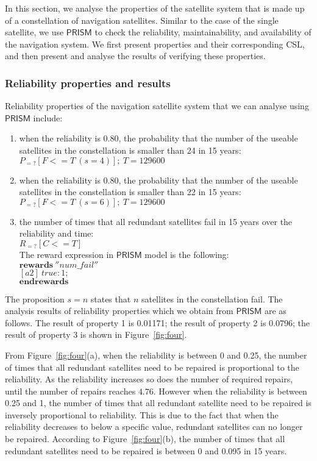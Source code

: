 \documentclass[preprint,12pt]{qrei}
\begin{document}
In this section, we analyse the properties of the satellite system that is made up of a constellation of navigation satellites. Similar to the case of the single satellite, we use $\mathsf{PRISM}$ to check the reliability, maintainability, and availability of the navigation system. We first present properties and their corresponding CSL, and then present and analyse the results of verifying these properties.

\subsubsection{Reliability properties and results}

Reliability properties of the navigation satellite system that we can analyse using $\mathsf{PRISM}$ include:

\begin{enumerate}
\item when the reliability is 0.80, the probability that the number of the useable satellites in the constellation is smaller than 24 in 15 years:\\
$P_{=?}[F<=T\ (s=4)];\ T=129600$
\item when the reliability is 0.80, the probability that the number of the useable satellites in the constellation is smaller than 22 in 15 years:\\
$P_{=?}[F<=T\ (s=6)];\ T=129600$
\item the number of times that all redundant satellites fail in 15 years over the reliability and time:\\
$R_{=?}[C<=T]$\\
The reward expression in $\mathsf{PRISM}$ model is the following:\\
$\textbf{rewards}\ ''num\_fail''$\\
$[a2]\ true:1;$\\
$\textbf{endrewards}$
\end{enumerate}

The proposition $s=n$ states that $n$ satellites in the constellation fail.
The analysis results of reliability properties which we obtain from $\mathsf{PRISM}$ are as follows. The result of property 1 is 0.01171; the result of property 2 is 0.0796; the result of property 3 is shown in Figure~\ref{fig:four}.

From Figure~\ref{fig:four}(a), when the reliability is between 0 and 0.25, the number of times that all redundant satellites need to be repaired is proportional to the reliability. As the reliability increases so does the number of required repairs, until the number of repairs reaches $4.76$. However when the reliability is between 0.25 and 1, the number of times that all redundant satellite need to be repaired is inversely proportional to reliability. This is due to the fact that when the reliability decreases to below a specific value, redundant satellites can no longer be repaired. According to Figure~\ref{fig:four}(b), the number of times that all redundant satellites need to be repaired is between 0 and 0.095 in 15 years.
\end{document}
